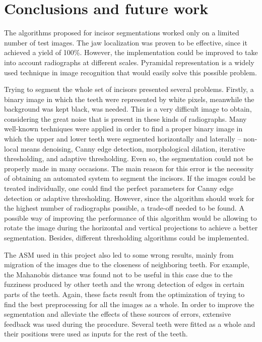 \documentclass[a4paper,11pt,twoside]{article}
\begin{document}
\section{Conclusions and future work}\label{conclusions}

The algorithms proposed for incisor segmentations worked only on a limited number of test images. The jaw localization was proven to be effective, since it achieved a yield of 100\%. However, the implementation could be improved to take into account radiographs at different scales. Pyramidal representation is a widely used technique in image recognition that would easily solve this possible problem. 

Trying to segment the whole set of incisors presented several problems. Firstly, a binary image in which the teeth were represented by white pixels, meanwhile the background was kept black, was needed. This is a very difficult image to obtain, considering the great noise that is present in these kinds of radiographs. Many well-known techniques were applied in order to find a proper binary image in which the upper and lower teeth were segmented horizontally and laterally -- non-local means denoising, Canny edge detection, morphological dilation, iterative thresholding, and adaptive thresholding. Even so, the segmentation could not be properly made in many occasions. The main reason for this error is the necessity of obtaining an automated system to segment the incisors. If the images could be treated individually, one could find the perfect parameters for Canny edge detection or adaptive thresholding. However, since the algorithm should work for the highest number of radiographs possible, a trade-off needed to be found. A possible way of improving the performance of this algorithm would be allowing to rotate the image during the horizontal and vertical projections to achieve a better segmentation. Besides, different thresholding algorithms could be implemented.

The ASM used in this project also led to some wrong results, mainly from migration of the images due to the closeness of neighboring teeth. For example, the Mahanobis distance was found not to be useful in this case due to the fuzziness produced by other teeth and the wrong detection of edges in certain parts of the teeth. Again, these facts result from the optimization of trying to find the best preprocessing for all the images as a whole. In order to improve the segmentation and alleviate the effects of these sources of errors, extensive feedback was used during the procedure. Several teeth were fitted as a whole and their positions were used as inputs for the rest of the teeth. 
\end{document}
